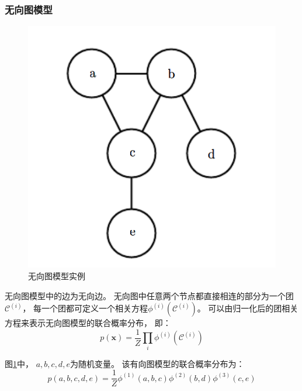 \subsubsection{无向图模型}
\begin{figure}[ht]
    \centering
    \includegraphics[height=0.3\textheight]{figures/undirected_graph_model}
    \caption{无向图模型实例}\label{fig:undirected_graph_model}
\end{figure}
无向图模型中的边为无向边。
无向图中任意两个节点都直接相连的部分为一个团{$\mathcal{C}^{(i)}$}，
每一个团都可定义一个相关方程{$\phi^{(i)}(\mathcal{C}^{(i)})$}。
可以由归一化后的团相关方程来表示无向图模型的联合概率分布，
即：
\begin{equation}
    \label{eq:undirected_graph_model}
    p(\bm{x})=\frac{1}{Z}\prod_{i} \phi^{(i)} ( \mathcal{C}^{(i)} )
\end{equation}

图{\ref{fig:undirected_graph_model}}中，
{$a,b,c,d,e$}为随机变量。
该有向图模型的联合概率分布为：
\begin{equation}
    p(a,b,c,d,e)
    =\frac{1}{Z} \phi^{(1)}(a,b,c) \phi^{(2)}(b,d) \phi^{(3)}(c,e)
\end{equation}








